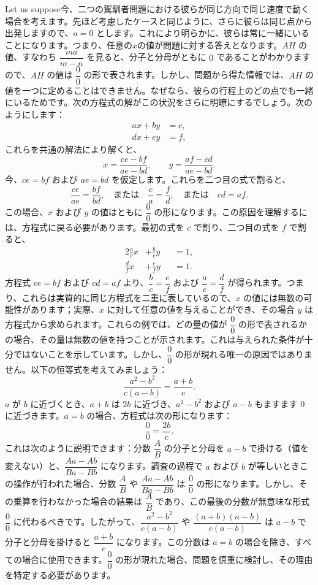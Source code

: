 \documentclass[a4paper,11pt,openany]{ltjsbook}
\begin{document}
Let us suppose今、二つの駕馴者問題における彼らが同じ方向で同じ速度で動く場合を考えます。先ほど考慮したケースと同じように、さらに彼らは同じ点から出発しますので、$a = 0$ とします。これにより明らかに、彼らは常に一緒にいることになります。つまり、任意の$x$の値が問題に対する答えとなります。$AH$ の値、すなわち $\dfrac{ma}{m - n}$ を見ると、分子と分母がともに $0$ であることがわかりますので、$AH$ の値は $\dfrac{0}{0}$ の形で表されます。しかし、問題から得た情報では、$AH$ の値を一つに定めることはできません。なぜなら、彼らの行程上のどの点でも一緒にいるためです。次の方程式の解がこの状況をさらに明瞭にするでしょう。次のようにします：
\begin{align*}
ax + by &= c, \\
dx + ey &= f,
\end{align*}
これらを共通の解法により解くと、
\[
x = \frac{ce - bf}{ae - bd}, \qquad y = \frac{af - cd}{ae - bd}.
\]
今、$ce = bf$ および $ae = bd$ を仮定します。これらを二つ目の式で割ると、
\[
\frac{ce}{ae} = \frac{bf}{bd}, \quad \text{または} \quad \frac{c}{a} = \frac{f}{d}, \quad \text{または} \quad cd = af.
\]
この場合、$x$ および $y$ の値はともに $\dfrac{0}{0}$ の形になります。この原因を理解するには、方程式に戻る必要があります。最初の式を $c$ で割り、二つ目の式を $f$ で割ると、
\begin{alignat*}{2}
\frac{a}{c} x &+ \frac{b}{c} y &&= 1, \\
\frac{d}{f} x &+ \frac{e}{f} y &&= 1.
\end{alignat*}
方程式 $ce = bf$ および $cd = af$ より、$\dfrac{b}{c} = \dfrac{e}{f}$ および $\dfrac{a}{c} = \dfrac{d}{f}$ が得られます。つまり、これらは実質的に同じ方程式を二重に表しているので、$x$ の値には無数の可能性があります；実際、$x$ に対して任意の値を与えることができ、その場合 $y$ は方程式から求められます。これらの例では、どの量の値が $\dfrac{0}{0}$ の形で表されるかの場合、その量は無数の値を持つことが示されます。これは与えられた条件が十分ではないことを示しています。しかし、$\dfrac{0}{0}$ の形が現れる唯一の原因ではありません。以下の恒等式を考えてみましょう：
\[
\frac{a^{2} - b^{2}}{c(a - b)} = \frac{a + b}{c}.
\]
$a$ が $b$ に近づくとき、$a + b$ は $2b$ に近づき、$a^{2} - b^{2}$ および $a - b$ もますます $0$ に近づきます。$a = b$ の場合、方程式は次の形になります：
\[
\frac{0}{0} = \frac{2b}{c}.
\]
これは次のように説明できます：分数 $\dfrac{A}{B}$ の分子と分母を $a - b$ で掛ける（値を変えない）と、$\dfrac{Aa - Ab}{Ba - Bb}$ になります。調査の過程で $a$ および $b$ が等しいときこの操作が行われた場合、分数 $\dfrac{A}{B}$ や $\dfrac{Aa - Ab}{Ba - Bb}$ は $\dfrac{0}{0}$ の形になります。しかし、その乗算を行わなかった場合の結果は $\dfrac{A}{B}$ であり、この最後の分数が無意味な形式 $\dfrac{0}{0}$ に代わるべきです。したがって、$\dfrac{a^{2} - b^{2}}{c(a - b)}$ や $\dfrac{(a + b)(a - b)}{c(a - b)}$ は $a - b$ で分子と分母を掛けると $\dfrac{a + b}{c}$ になります。この分数は $a = b$ の場合を除き、すべての場合に使用できます。$\dfrac{0}{0}$ の形が現れた場合、問題を慎重に検討し、その理由を特定する必要があります。
\end{document}
